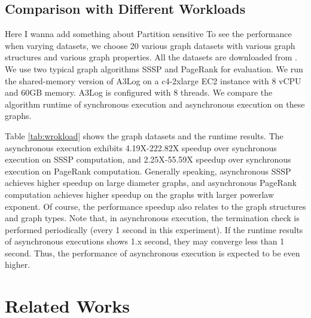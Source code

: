 \subsection{Comparison with Different Workloads}
\label{sec:expr:workloads}
{\color{red}Here I wanna add something about Partition sensitive}
To see the performance when varying datasets, we choose 20 various graph datasets with various graph structures and various graph properties. All the datasets are downloaded from \cite{konect}. We use two typical graph algorithms SSSP and PageRank for evaluation. We run the shared-memory version of A3Log on a c4-2xlarge EC2 instance with 8 vCPU and 60GB memory. A3Log is configured with 8 threads. We compare the algorithm runtime of synchronous execution and asynchronous execution on these graphs.

Table \ref{tab:wrokload} shows the graph datasets and the runtime results. The asynchronous execution exhibits 4.19X-222.82X speedup over synchronous execution on SSSP computation, and 2.25X-55.59X speedup over synchronous execution on PageRank computation. Generally speaking, asynchronous SSSP achieves higher speedup on large diameter graphs, and asynchronous PageRank computation achieves higher speedup on the graphs with larger powerlaw exponent. Of course, the performance speedup also relates to the graph structures and graph types. Note that, in asynchronous execution, the termination check is performed periodically (every 1 second in this experiment). If the runtime results of asynchronous executions shows 1.x second, they may converge less than 1 second. Thus, the performance of asynchronous execution is expected to be even higher.

\section{Related Works}
\label{sec:related}

